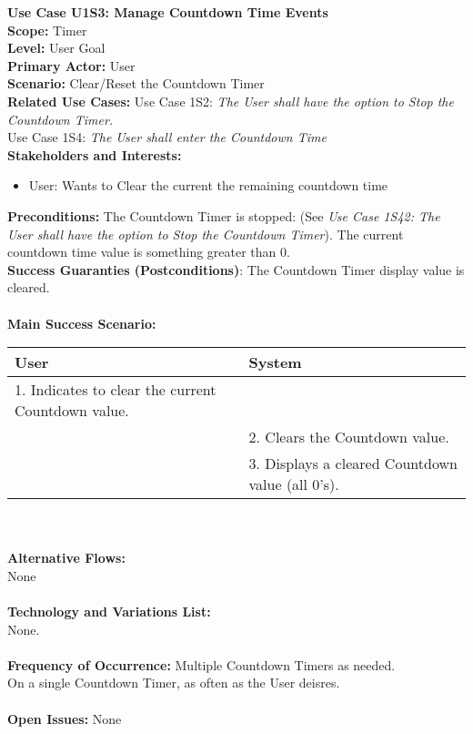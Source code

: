 \documentclass[letterpaper]{article}
\begin{document}
\noindent
\textbf{Use Case U1S3:  Manage Countdown Time Events}\\
\textbf{Scope:  }Timer\\
\textbf{Level:  }User Goal\\
\textbf{Primary Actor:  }User\\
\textbf{Scenario:  }Clear/Reset the Countdown Timer\\
\textbf{Related Use Cases:  }Use Case 1S2:  \textit{The User shall
have the option to Stop the Countdown Timer.}\\
Use Case 1S4:  \textit{The User shall enter the Countdown Time}\\
\textbf{Stakeholders and Interests:}
\begin{itemize}
\item User:  Wants to Clear the current the remaining countdown time
\end{itemize}
\textbf{Preconditions:  }The Countdown Timer is stopped:  (See
\textit{Use Case 1S42: The User shall have the option to Stop the
Countdown Timer}).  The current countdown time value is something
greater than 0.\\
\textbf{Success Guaranties  (Postconditions)}: 
The Countdown Timer display value is cleared.\\\\
\textbf{Main Success Scenario: }\\
\begin{tabular}{|p{6cm}|p{6cm}|}\hline
\textbf{User} & \textbf{System}\\\hline
1.  Indicates to clear the current Countdown value. & \\\hline
&2.  Clears the Countdown value.\\\hline
&3.  Displays a cleared Countdown value (all 0's).\\\hline
\end{tabular}\\\\
\textbf{Alternative Flows:  }\\
None\\\\
\textbf{Technology and Variations List:  }\\
None.\\\\
\textbf{Frequency of Occurrence:  }Multiple Countdown Timers as
needed.\\
On a single Countdown Timer, as often as the User deisres.\\\\
\textbf{Open Issues:  }
None
\end{document}
